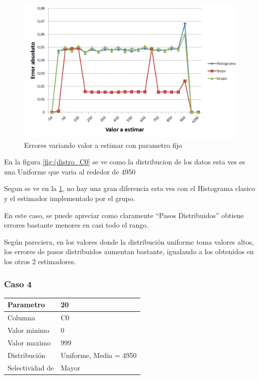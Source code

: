 	\begin{figure}[H]
	  \begin{center}
	    \includegraphics[scale=.40]{imagenes/C0_variando_valor.png}
	    \caption{Errores variando valor a estimar con parametro fijo} 
	    \label{fig:C0_variando_valor}
	  \end{center}
	\end{figure}	

		En la figura \ref{fig:(distro_C0} se ve como la distribucion de los datos esta ves es una Uniforme que varia al rededor de 4950
		
		Segun se ve en la \ref{fig:C0_variando_valor}, no hay una gran diferencia esta ves con el Histograma clasico y el estimador implementado por el grupo. 
		
		En este caso, se puede apreciar como claramente ``Pasos Distribuidos'' obtiene errores bastante menores en casi todo el rango.
		
		Seg\'un pareciera, en los valores donde la distribuci\'on uniforme toma valores altos, los errores de pasos distribuidos aumentan bastante, igualando a los obtenidos en los otros 2 estimadores.


		\subsubsection*{Caso 4}
		
		\begin{tabular}{| l | l |}
		\hline
		Parametro & 20 \\
		\hline
		Columna & C0 \\
		\hline
		Valor minimo & 0 \\
		\hline
		Valor maximo & 999 \\
		\hline
		Distribuci\'on & Uniforme, Media = 4950 \\
		\hline
		Selectividad de & Mayor \\
		\hline
		\end{tabular}		

